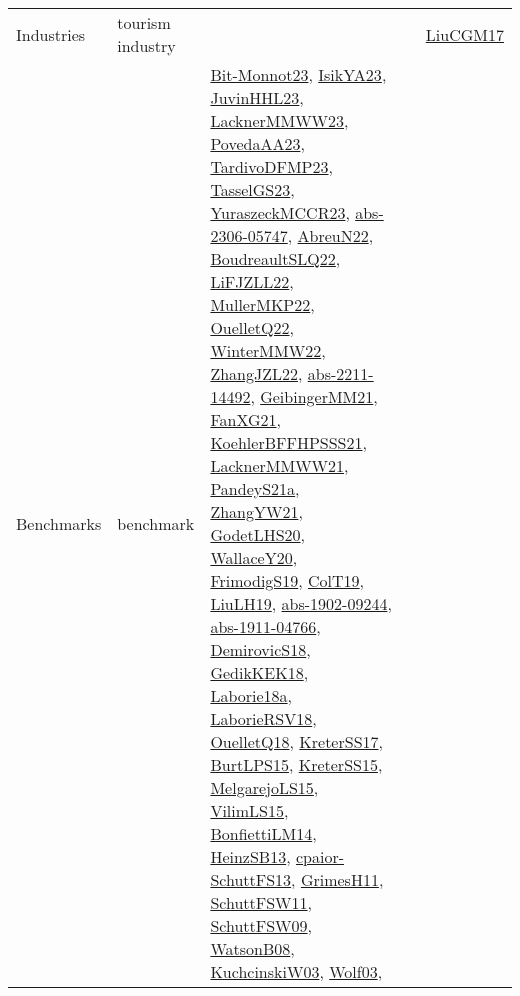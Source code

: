 {\begin{longtable}{lp{3cm}>{\raggedright}p{6cm}>{\raggedright}p{6cm}p{8cm}}
Industries & tourism industry &  &  & \href{papers/LiuCGM17.pdf}{LiuCGM17}\cite{LiuCGM17}\\
Benchmarks & benchmark & \href{papers/Bit-Monnot23.pdf}{Bit-Monnot23}\cite{Bit-Monnot23}, \href{articles/IsikYA23.pdf}{IsikYA23}\cite{IsikYA23}, \href{papers/JuvinHHL23.pdf}{JuvinHHL23}\cite{JuvinHHL23}, \href{articles/LacknerMMWW23.pdf}{LacknerMMWW23}\cite{LacknerMMWW23}, \href{papers/PovedaAA23.pdf}{PovedaAA23}\cite{PovedaAA23}, \href{papers/TardivoDFMP23.pdf}{TardivoDFMP23}\cite{TardivoDFMP23}, \href{papers/TasselGS23.pdf}{TasselGS23}\cite{TasselGS23}, \href{articles/YuraszeckMCCR23.pdf}{YuraszeckMCCR23}\cite{YuraszeckMCCR23}, \href{articles/abs-2306-05747.pdf}{abs-2306-05747}\cite{abs-2306-05747}, \href{articles/AbreuN22.pdf}{AbreuN22}\cite{AbreuN22}, \href{papers/BoudreaultSLQ22.pdf}{BoudreaultSLQ22}\cite{BoudreaultSLQ22}, \href{papers/LiFJZLL22.pdf}{LiFJZLL22}\cite{LiFJZLL22}, \href{articles/MullerMKP22.pdf}{MullerMKP22}\cite{MullerMKP22}, \href{papers/OuelletQ22.pdf}{OuelletQ22}\cite{OuelletQ22}, \href{papers/WinterMMW22.pdf}{WinterMMW22}\cite{WinterMMW22}, \href{papers/ZhangJZL22.pdf}{ZhangJZL22}\cite{ZhangJZL22}, \href{articles/abs-2211-14492.pdf}{abs-2211-14492}\cite{abs-2211-14492}, \href{papers/GeibingerMM21.pdf}{GeibingerMM21}\cite{GeibingerMM21}, \href{articles/FanXG21.pdf}{FanXG21}\cite{FanXG21}, \href{articles/KoehlerBFFHPSSS21.pdf}{KoehlerBFFHPSSS21}\cite{KoehlerBFFHPSSS21}, \href{papers/LacknerMMWW21.pdf}{LacknerMMWW21}\cite{LacknerMMWW21}, \href{articles/PandeyS21a.pdf}{PandeyS21a}\cite{PandeyS21a}, \href{articles/ZhangYW21.pdf}{ZhangYW21}\cite{ZhangYW21}, \href{papers/GodetLHS20.pdf}{GodetLHS20}\cite{GodetLHS20}, \href{articles/WallaceY20.pdf}{WallaceY20}\cite{WallaceY20}, \href{papers/FrimodigS19.pdf}{FrimodigS19}\cite{FrimodigS19}, \href{papers/ColT19.pdf}{ColT19}\cite{ColT19}, \href{papers/LiuLH19.pdf}{LiuLH19}\cite{LiuLH19}, \href{articles/abs-1902-09244.pdf}{abs-1902-09244}\cite{abs-1902-09244}, \href{articles/abs-1911-04766.pdf}{abs-1911-04766}\cite{abs-1911-04766}, \href{papers/DemirovicS18.pdf}{DemirovicS18}\cite{DemirovicS18}, \href{articles/GedikKEK18.pdf}{GedikKEK18}\cite{GedikKEK18}, \href{papers/Laborie18a.pdf}{Laborie18a}\cite{Laborie18a}, \href{articles/LaborieRSV18.pdf}{LaborieRSV18}\cite{LaborieRSV18}, \href{papers/OuelletQ18.pdf}{OuelletQ18}\cite{OuelletQ18}, \href{articles/KreterSS17.pdf}{KreterSS17}\cite{KreterSS17}, \href{papers/BurtLPS15.pdf}{BurtLPS15}\cite{BurtLPS15}, \href{papers/KreterSS15.pdf}{KreterSS15}\cite{KreterSS15}, \href{papers/MelgarejoLS15.pdf}{MelgarejoLS15}\cite{MelgarejoLS15}, \href{papers/VilimLS15.pdf}{VilimLS15}\cite{VilimLS15}, \href{papers/BonfiettiLM14.pdf}{BonfiettiLM14}\cite{BonfiettiLM14}, \href{articles/HeinzSB13.pdf}{HeinzSB13}\cite{HeinzSB13}, \href{papers/cpaior-SchuttFS13.pdf}{cpaior-SchuttFS13}\cite{cpaior-SchuttFS13}, \href{papers/GrimesH11.pdf}{GrimesH11}\cite{GrimesH11}, \href{articles/SchuttFSW11.pdf}{SchuttFSW11}\cite{SchuttFSW11}, \href{papers/SchuttFSW09.pdf}{SchuttFSW09}\cite{SchuttFSW09}, \href{papers/WatsonB08.pdf}{WatsonB08}\cite{WatsonB08}, \href{articles/KuchcinskiW03.pdf}{KuchcinskiW03}\cite{KuchcinskiW03}, \href{papers/Wolf03.pdf}{Wolf03}\cite{Wolf03}, 
\end{longtable}}
